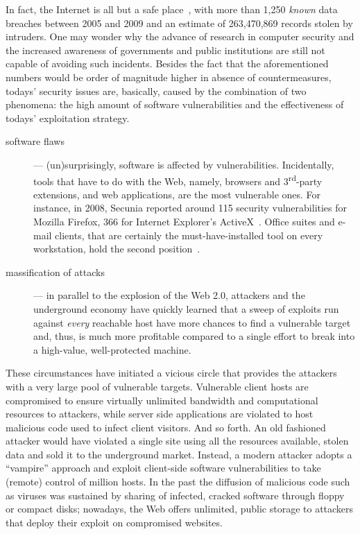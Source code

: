 In fact, the Internet is all but a safe place~\citep{whid}, with more than 1,250 \emph{known} data breaches between 2005 and 2009 \citep{data-breaches-chronology} and an estimate of 263,470,869 records stolen by intruders. One may wonder why the advance of research in computer security and the increased awareness of governments and public institutions are still not capable of avoiding such incidents. Besides the fact that the aforementioned numbers would be order of magnitude higher in absence of countermeasures, todays' security issues are, basically, caused by the combination of two phenomena: the high amount of software vulnerabilities and the effectiveness of todays' exploitation strategy.

\begin{description}
\item[software flaws] --- (un)surprisingly, software is affected by
  vulnerabilities. Incidentally, tools that have to do with the Web,
  namely, browsers and 3\textsuperscript{rd}-party extensions, and web
  applications, are the most vulnerable ones. For instance, in 2008,
  \textsf{Secunia} reported around 115 security vulnerabilities for
  \textsf{Mozilla Firefox}, 366 for \textsf{Internet Explorer}'s
  \textsf{ActiveX}~\citep{secunia2008}. Office suites and e-mail
  clients, that are certainly the must\hyp{}have\hyp{}installed tool
  on every workstation, hold the second position~\citep{sans20}.
  
\item[massification of attacks] --- in parallel to the explosion of
  the Web 2.0, attackers and the underground economy have quickly
  learned that a sweep of exploits run against \emph{every} reachable
  host have more chances to find a vulnerable target and, thus, is
  much more profitable compared to a single effort to break into a
  high-value, well-protected machine.
\end{description}

These circumstances have initiated a vicious circle that provides the
attackers with a very large pool of vulnerable targets. Vulnerable
client hosts are compromised to ensure virtually unlimited bandwidth
and computational resources to attackers, while server side
applications are violated to host malicious code used to infect client
visitors. And so forth. An old fashioned attacker would have violated
a single site using all the resources available, stolen data and sold
it to the underground market. Instead, a modern attacker adopts a
``vampire'' approach and exploit client-side software vulnerabilities
to take (remote) control of million hosts. In the past the diffusion
of malicious code such as viruses was sustained by sharing of
infected, cracked software through floppy or compact disks; nowadays,
the Web offers unlimited, public storage to attackers that deploy
their exploit on compromised websites.

